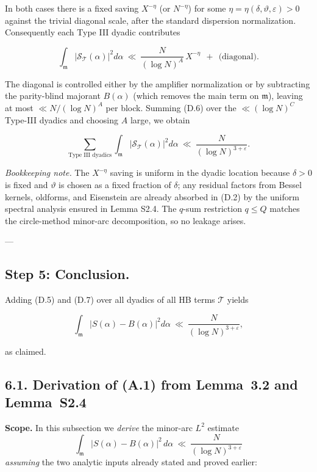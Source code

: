 \documentclass[11pt]{article}
\theoremstyle{definition}
\theoremstyle{remark}
\begin{document}
In both cases there is a fixed saving $X^{-\eta}$ (or $N^{-\eta}$) for some $\eta=\eta(\delta,\vartheta,\varepsilon)>0$ against the trivial diagonal scale, after the standard dispersion normalization. Consequently each Type III dyadic contributes

\begin{equation}
	\int_{\mathfrak m}\big|\mathcal S_{\mathcal T}(\alpha)\big|^2 d\alpha
	\ \ll\ \frac{N}{(\log N)^{A}}\,X^{-\eta}
	\ \ +\ \ \text{(diagonal)}.
	\tag{D.6}
\end{equation}

The diagonal is controlled either by the amplifier normalization or by subtracting the parity-blind majorant $B(\alpha)$ (which removes the main term on $\mathfrak m$), leaving at most $\ll N/(\log N)^A$ per block. Summing (D.6) over the $\ll(\log N)^C$ Type-III dyadics and choosing $A$ large, we obtain

\begin{equation}
	\sum_{\text{Type III dyadics}}
	\int_{\mathfrak m}\big|\mathcal S_{\mathcal T}(\alpha)\big|^2 d\alpha
	\ \ll\ \frac{N}{(\log N)^{3+\varepsilon}}.
	\tag{D.7}
\end{equation}

\emph{Bookkeeping note.} The $X^{-\eta}$ saving is uniform in the dyadic location because $\delta>0$ is fixed and $\vartheta$ is chosen as a fixed fraction of $\delta$; any residual factors from Bessel kernels, oldforms, and Eisenstein are already absorbed in (D.2) by the uniform spectral analysis ensured in Lemma S2.4. The $q$-sum restriction $q\le Q$ matches the circle-method minor-arc decomposition, so no leakage arises.

---

\subsection*{Step 5: Conclusion.}
Adding (D.5) and (D.7) over all dyadics of all HB terms $\mathcal T$ yields

$$
	\int_{\mathfrak m}\big|S(\alpha)-B(\alpha)\big|^2 d\alpha
	\ \ll\ \frac{N}{(\log N)^{3+\varepsilon}},
$$

as claimed.
\subsection*{6.1. Derivation of (A.1) from Lemma~3.2 and Lemma~S2.4}

\noindent\textbf{Scope.} In this subsection we \emph{derive} the minor-arc $L^2$ estimate
\[
	\int_{\mathfrak m}|S(\alpha)-B(\alpha)|^2\,d\alpha\ \ll\ \frac{N}{(\log N)^{3+\varepsilon}}
	\tag{A.1}
\]
\emph{assuming} the two analytic inputs already stated and proved earlier:
\end{document}
